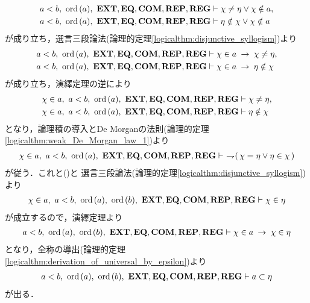 \begin{prf}
\begin{description}
\begin{align}
					a < b,\ \ord{a},\ \EXTAX,\EQAX,\COMAX,\REPAX,\REGAX &\vdash \chi \neq \eta \vee \chi \notin a, \\
					a < b,\ \ord{a},\ \EXTAX,\EQAX,\COMAX,\REPAX,\REGAX &\vdash \eta \notin \chi \vee \chi \notin a
				\end{align}
				が成り立ち，選言三段論法(論理的定理\ref{logicalthm:disjunctive_syllogism})より
				\begin{align}
					a < b,\ \ord{a},\ \EXTAX,\EQAX,\COMAX,\REPAX,\REGAX 
					&\vdash \chi \in a \rarrow \chi \neq \eta, \\
					a < b,\ \ord{a},\ \EXTAX,\EQAX,\COMAX,\REPAX,\REGAX 
					&\vdash \chi \in a \rarrow \eta \notin \chi
				\end{align}
				が成り立ち，演繹定理の逆により
				\begin{align}
					\chi \in a,\ a < b,\ \ord{a},\ \EXTAX,\EQAX,\COMAX,\REPAX,\REGAX &\vdash \chi \neq \eta,
					\label{fom:element_and_proper_subset_correspond_14} \\
					\chi \in a,\ a < b,\ \ord{a},\ \EXTAX,\EQAX,\COMAX,\REPAX,\REGAX &\vdash \eta \notin \chi
					\label{fom:element_and_proper_subset_correspond_15}
				\end{align}
				となり，論理積の導入とDe Morganの法則(論理的定理\ref{logicalthm:weak_De_Morgan_law_1})より
				\begin{align}
					\chi \in a,\ a < b,\ \ord{a},\ \EXTAX,\EQAX,\COMAX,\REPAX,\REGAX \vdash\ 
					\negation (\, \chi = \eta \vee \eta \in \chi\, )
				\end{align}
				が従う．これと()と
				選言三段論法(論理的定理\ref{logicalthm:disjunctive_syllogism})より
				\begin{align}
					\chi \in a,\ a < b,\ \ord{a},\ \ord{b},\ \EXTAX,\EQAX,\COMAX,\REPAX,\REGAX \vdash \chi \in \eta
				\end{align}
				が成立するので，演繹定理より
				\begin{align}
					a < b,\ \ord{a},\ \ord{b},\ \EXTAX,\EQAX,\COMAX,\REPAX,\REGAX \vdash 
					\chi \in a \rarrow \chi \in \eta
				\end{align}
				となり，全称の導出(論理的定理\ref{logicalthm:derivation_of_universal_by_epsilon})より
				\begin{align}
					a < b,\ \ord{a},\ \ord{b},\ \EXTAX,\EQAX,\COMAX,\REPAX,\REGAX \vdash a \subset \eta
					\label{fom:element_and_proper_subset_correspond_16}
				\end{align}
				が出る．
			

\end{description}
\end{prf}
